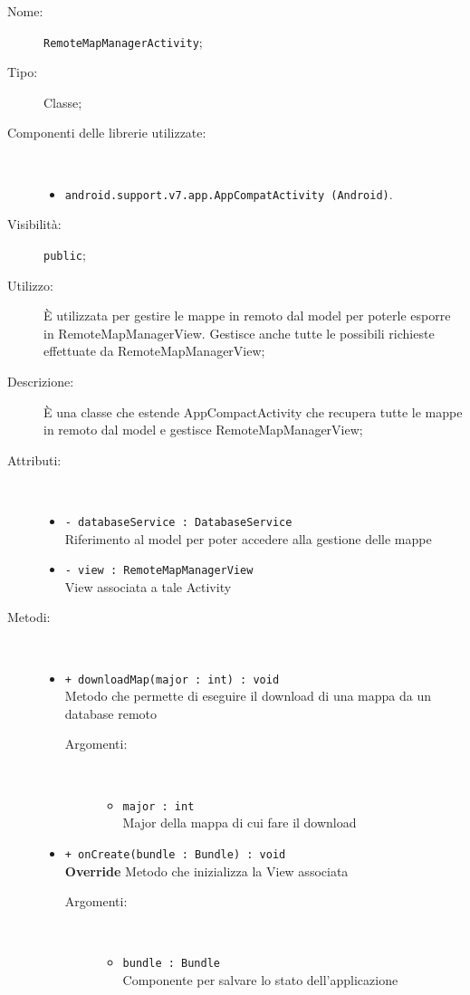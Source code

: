 \documentclass[../DefinizioneDiProdotto.tex]{subfiles}
\begin{document}
\begin{description}
	\item[Nome:] \texttt{RemoteMapManagerActivity};
	\item[Tipo:] Classe;
	\item[Componenti delle librerie utilizzate:] \
	\begin{itemize}
		\item \texttt{android.support.v7.app.AppCompatActivity (Android)}.
		
	\end{itemize}
	\item[Visibilità:] \texttt{public};
	\item[Utilizzo:] È utilizzata per gestire le mappe in remoto dal model per poterle esporre in RemoteMapManagerView. Gestisce anche tutte le possibili richieste effettuate da RemoteMapManagerView;
	\item[Descrizione:] È una classe che estende AppCompactActivity che recupera tutte le mappe in remoto dal model e gestisce RemoteMapManagerView;
	\item[Attributi:] \
	\begin{itemize}
		\item \texttt{- databaseService : DatabaseService}\\
		Riferimento al model per poter accedere alla gestione delle mappe
		
		\item \texttt{- view : RemoteMapManagerView}\\
		View associata a tale Activity
		
	\end{itemize}
	\item[Metodi:] \
	\begin{itemize}
		\item \texttt{+ downloadMap(major : int) : void}\\
		Metodo che permette di eseguire il download di una mappa da un database remoto
		\begin{description}
			\item[Argomenti:] \
			\begin{itemize}
				\item \texttt{major : int}\\
				Major della mappa di cui fare il download\end{itemize}
		\end{description}
		\item \texttt{+ onCreate(bundle : Bundle) : void}\\
		\textbf{Override} Metodo che inizializza la View associata
		\begin{description}
			\item[Argomenti:] \
			\begin{itemize}
				\item \texttt{bundle : Bundle}\\
				Componente per salvare lo stato dell'applicazione\end{itemize}
		\end{description}
	\end{itemize}
\end{description}
\end{document}
